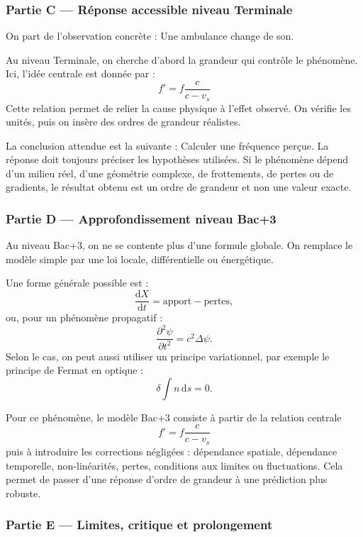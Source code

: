 \documentclass[11pt,a4paper]{article}
\begin{document}
\subsubsection*{Partie C — Réponse accessible niveau Terminale}

\begin{corrigebox}
On part de l'observation concrète : Une ambulance change de son.

Au niveau Terminale, on cherche d'abord la grandeur qui contrôle le phénomène. Ici, l'idée centrale est donnée par :
\[
f'=f\frac{c}{c-v_s}
\]
Cette relation permet de relier la cause physique à l'effet observé. On vérifie les unités, puis on insère des ordres de grandeur réalistes.

La conclusion attendue est la suivante : Calculer une fréquence perçue. La réponse doit toujours préciser les hypothèses utilisées. Si le phénomène dépend d'un milieu réel, d'une géométrie complexe, de frottements, de pertes ou de gradients, le résultat obtenu est un ordre de grandeur et non une valeur exacte.
\end{corrigebox}

\subsubsection*{Partie D — Approfondissement niveau Bac+3}

\begin{approfondissementbox}
Au niveau Bac+3, on ne se contente plus d'une formule globale. On remplace le modèle simple par une loi locale, différentielle ou énergétique.

Une forme générale possible est :
\[
\frac{\mathrm d X}{\mathrm dt}=\text{apport}-\text{pertes},
\]
ou, pour un phénomène propagatif :
\[
\frac{\partial^2 \psi}{\partial t^2}=c^2\Delta\psi.
\]
Selon le cas, on peut aussi utiliser un principe variationnel, par exemple le principe de Fermat en optique :
\[
\delta \int n\,\mathrm ds=0.
\]

Pour ce phénomène, le modèle Bac+3 consiste à partir de la relation centrale
\[
f'=f\frac{c}{c-v_s}
\]
puis à introduire les corrections négligées : dépendance spatiale, dépendance temporelle, non-linéarités, pertes, conditions aux limites ou fluctuations. Cela permet de passer d'une réponse d'ordre de grandeur à une prédiction plus robuste.
\end{approfondissementbox}

\subsubsection*{Partie E — Limites, critique et prolongement}
\end{document}
